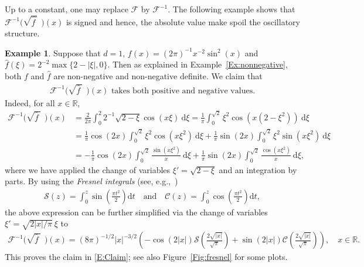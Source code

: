 \documentclass[a4paper,11pt]{article}%
\theoremstyle{plain}
\theoremstyle{definition}
\newtheorem{example}[theorem]{Example}
\numberwithin{equation}{section}
\newcommand{\R}{\mathbb{R}}
\newcommand{\ud}{\ensuremath{\mathrm{d}}}
\begin{document}
Up to a constant, one may replace $\mathcal{F}$ by $\mathcal{F}^{-1}$. The following example shows
that $\mathcal{F}^{-1}\big(\sqrt{\widehat{f\:}}\:\:\big)(x)$ is signed and hence, the absolute value
make spoil the oscillatory structure.

\begin{example}\label{Ex:Finv}
  Suppose that $d = 1$, $f(x) = (2\pi)^{-1}x^{-2}\sin^2 (x)$ and $\widehat{f}(\xi) =
  2^{-2}\max\{2-|\xi|,0\}$. Then as explained in Example~\ref{Ex:nonnegative}, both $f$ and
  $\widehat{f}$ are non-negative and non-negative definite. We claim that
	\begin{align}\label{E:Claim}
	\text{$\mathcal{F}^{-1}\big(\sqrt{\widehat{f}\:}\:\:\big)(x)$ takes both positive and negative values.}
	\end{align}
	Indeed, for all $x\in\R$,
	\begin{align*}
    \mathcal{F}^{-1}\big(\sqrt{\widehat{f}\:}\:\:\big)(x)
    & = \frac{2}{2\pi} \int_0^2 2^{-1}\sqrt{2-\xi} \cos(x \xi) \: \ud \xi
      = \frac{1}{\pi} \int_0^{\sqrt{2}} \xi^2 \cos\left(x\left(2-\xi^2\right)\right) \: \ud \xi \\
    & = \frac{1}{\pi}\cos(2x) \int_0^{\sqrt{2}} \xi^2 \cos(x \xi^2) \: \ud \xi + \frac{1}{\pi} \sin(2x) \int_0^{\sqrt{2}} \xi^2 \sin(x \xi^2) \: \ud \xi \\
    & = - \frac{1}{\pi} \cos(2x) \int_0 ^{\sqrt{2}} \frac{\sin(x \xi^2)}{x} \: \ud \xi + \frac{1}{\pi} \sin(2x) \int_0 ^{\sqrt{2}} \frac{\cos(x \xi^2)}{x} \: \ud \xi,
  \end{align*}
  where we have applied the change of variables $\xi' = \sqrt{2 - \xi}$ and an integration by parts.
  By using the \textit{Fresnel integrals} (see, e.g.,~\cite[7.2 (iii)]{olver.lozier.ea:10:nist})
  \begin{align*}
    \mathcal{S}(z) = \int_0^{z} \sin\left(\frac{\pi t^2}{2}\right) \ud t \quad \text{and} \quad
    \mathcal{C}(z) = \int_0^z \cos\left(\frac{\pi t^2}{2}\right) \ud t,
	\end{align*}
	the above expression can be further simplified via the change of variables $\xi' = \sqrt{2|x|/\pi}
	\: \xi$ to
	\begin{align*}
	\mathcal{F}^{-1}\big(\sqrt{\widehat{f}\:}\:\:\big)(x)
	= (8\pi)^{-1/2} |x|^{-3/2} \left(-\cos(2|x|)\mathcal{S}\left(\frac{2\sqrt{|x|}}{\sqrt{\pi}}\right) + \sin(2|x|) \mathcal{C}\left( \frac{2 \sqrt{|x|}}{\sqrt{\pi}} \right) \right), \quad x \in \R.
	\end{align*}
  This proves the claim in \eqref{E:Claim}; see also Figure~\ref{Fig:fresnel} for some plots.
\end{example}
\end{document}
